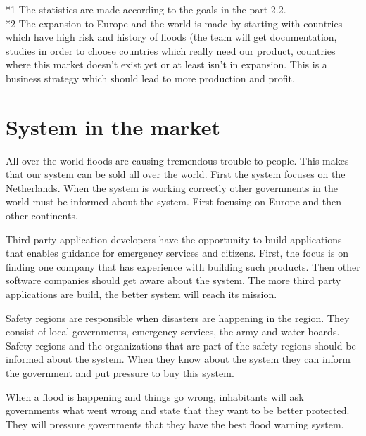 *1 The statistics are made according to the goals in the part 2.2. \\
*2 The expansion to Europe and the world is made by starting with countries which have high risk and history of floods (the team will get documentation, studies in order to choose countries which really need our product, countries where this market doesn't exist yet or at least isn't in expansion. This is a business strategy which should lead to more production and profit.\\

\section{System in the market}
All over the world floods are causing tremendous trouble to people. This makes that our system can be sold all over the world. First the system focuses on the Netherlands. When the system is working correctly other governments in the world must be informed about the system. First focusing on Europe and then other continents.

Third party application developers have the opportunity to build applications that enables guidance for emergency services and citizens. First, the focus is on finding one company that has experience with building such products. Then other software companies should get aware about the system. The more third party applications are build, the better system will reach its mission.

Safety regions are responsible when disasters are happening in the region. They consist of local governments, emergency services, the army and water boards. Safety regions and the organizations that are part of the safety regions should be informed about the system. When they know about the system they can inform the government and put pressure to buy this system.

When a flood is happening and things go wrong, inhabitants will ask governments what went wrong and state that they want to be better protected. They will pressure governments that they have the best flood warning system.

